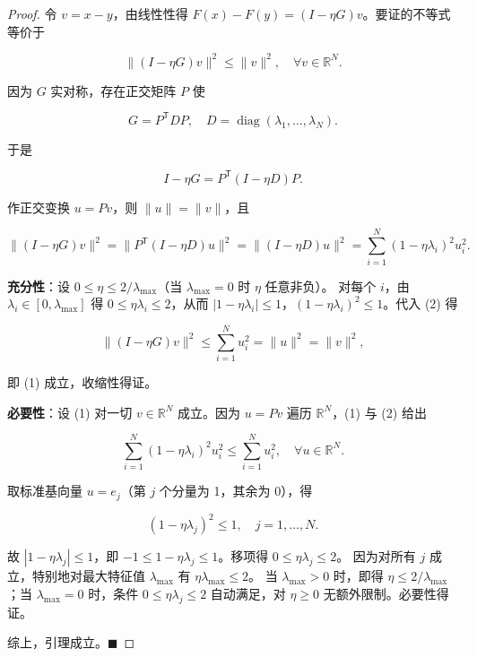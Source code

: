 \begin{proof}\label{lem:contraction}
令 $v = x - y$，由线性性得 $F(x)-F(y) = (I-\eta G)v$。要证的不等式等价于  

\begin{equation}
\|(I-\eta G)v\|^2 \le \|v\|^2, \quad \forall v \in \mathbb{R}^N. \tag{1}
\end{equation}

因为 $G$ 实对称，存在正交矩阵 $P$ 使  

\begin{equation}
G = P^{\mathsf T} D P, \quad D = \operatorname{diag}(\lambda_1, \dots, \lambda_N).
\end{equation}

于是  

\begin{equation}
I - \eta G = P^{\mathsf T}(I - \eta D)P.
\end{equation}

作正交变换 $u = Pv$，则 $\|u\| = \|v\|$，且  

\begin{equation}
\|(I-\eta G)v\|^2 = \|P^{\mathsf T}(I-\eta D)u\|^2 = \|(I-\eta D)u\|^2 = \sum_{i=1}^N (1 - \eta\lambda_i)^2 u_i^2. \tag{2}
\end{equation}

\textbf{充分性}：设 $0 \le \eta \le 2/\lambda_{\max}$（当 $\lambda_{\max}=0$ 时 $\eta$ 任意非负）。  
对每个 $i$，由 $\lambda_i \in [0, \lambda_{\max}]$ 得 $0 \le \eta\lambda_i \le 2$，从而 $|1 - \eta\lambda_i| \le 1$，$(1 - \eta\lambda_i)^2 \le 1$。代入 (2) 得  

\begin{equation}
\|(I-\eta G)v\|^2 \le \sum_{i=1}^N u_i^2 = \|u\|^2 = \|v\|^2,
\end{equation}

即 (1) 成立，收缩性得证。

\textbf{必要性}：设 (1) 对一切 $v \in \mathbb{R}^N$ 成立。因为 $u = Pv$ 遍历 $\mathbb{R}^N$，(1) 与 (2) 给出  

\begin{equation}
\sum_{i=1}^N (1 - \eta\lambda_i)^2 u_i^2 \le \sum_{i=1}^N u_i^2, \quad \forall u \in \mathbb{R}^N.
\end{equation}

取标准基向量 $u = e_j$（第 $j$ 个分量为 1，其余为 0），得  

\begin{equation}
(1 - \eta\lambda_j)^2 \le 1, \quad j = 1,\dots,N.
\end{equation}

故 $|1 - \eta\lambda_j| \le 1$，即 $-1 \le 1 - \eta\lambda_j \le 1$。移项得 $0 \le \eta\lambda_j \le 2$。  
因为对所有 $j$ 成立，特别地对最大特征值 $\lambda_{\max}$ 有 $\eta\lambda_{\max} \le 2$。  
当 $\lambda_{\max} > 0$ 时，即得 $\eta \le 2/\lambda_{\max}$；当 $\lambda_{\max} = 0$ 时，条件 $0 \le \eta\lambda_j \le 2$ 自动满足，对 $\eta \ge 0$ 无额外限制。必要性得证。

综上，引理成立。$\blacksquare$
\end{proof}

